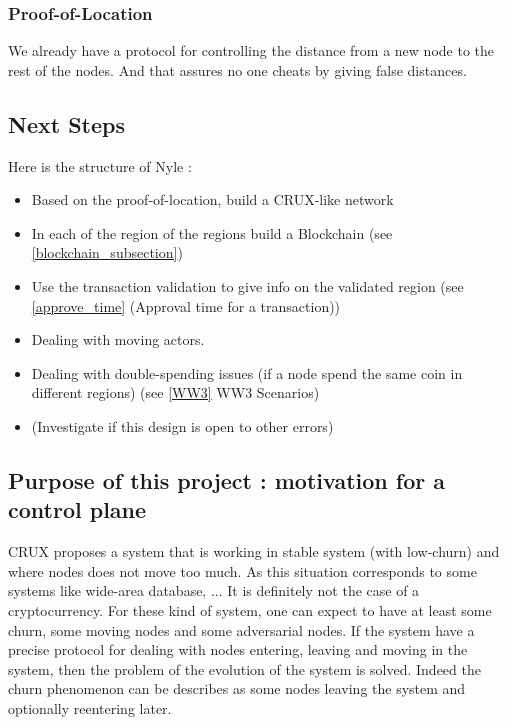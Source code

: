 \documentclass[a4paper,11pt,oneside]{report}
\begin{document}
\subsubsection{Proof-of-Location} We already have a protocol for controlling
the distance from a new node to the rest of the nodes. And that assures no one
cheats by giving false distances. 


\subsection{Next Steps} Here is the structure of Nyle :

\begin{itemize} 
\item Based on the proof-of-location, build a CRUX-like network
\item In each of the region of the regions build a Blockchain 
(see \ref{blockchain_subsection})
\item Use the transaction validation to  give info on the validated region
(see \ref{approve_time} (Approval time for a transaction))
\item Dealing with moving actors.
\item Dealing with double-spending issues
(if a node spend the same coin in different regions) 
(see \ref{WW3} WW3 Scenarios) 
\item (Investigate if this design is open to other errors)
\end{itemize}

\subsection{Purpose of this project : motivation for a control plane}

CRUX proposes a system that is working in stable system (with low-churn) and where
nodes does not move too much. As this situation corresponds to some systems
like wide-area database, ... It is definitely not the case of a cryptocurrency.
For these kind of system, one can expect to have at least some churn, some
moving nodes and some adversarial nodes.  If the system have a precise protocol
for dealing with nodes entering, leaving and moving in the system, then the
problem of the evolution of the system is solved. Indeed the churn phenomenon
can be describes as some nodes leaving the system and optionally reentering
later. 
\end{document}
